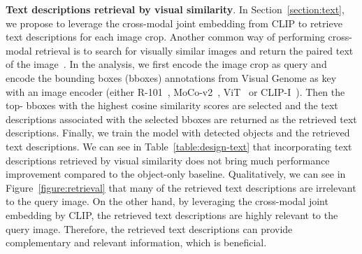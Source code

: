 \documentclass[10pt,twocolumn,letterpaper]{article}
\begin{document}
\begin{table}
\centering
\renewcommand{\arraystretch}{1.2}
\caption{
Retrieving text descriptions by visual similarity with different image encoders.
}
\label{table:design-text}
\end{table} \textbf{Text descriptions retrieval by visual similarity}.
In Section~\ref{section:text}, we propose to leverage the cross-modal joint embedding from CLIP to retrieve text descriptions for each image crop.
Another common way of performing cross-modal retrieval is to search for visually similar images and return the paired text of the image~\cite{gong2014improving,hodosh2013framing,ordonez2011im2text,sun2015automatic}.
In the analysis, we first encode the image crop as query and encode the bounding boxes (bboxes) annotations from Visual Genome as key with an image encoder (either R-101~\cite{he2016deep}, MoCo-v2~\cite{chen2020mocov2}, ViT~\cite{dosovitskiy2020vit} or CLIP-I~\cite{Radford2021LearningTV}).
Then the top- bboxes with the highest cosine similarity scores are selected and the text descriptions associated with the selected bboxes are returned as the retrieved text descriptions.
Finally, we train the  model with detected objects and the retrieved text descriptions.
We can see in Table~\ref{table:design-text} that incorporating text descriptions retrieved by visual similarity does not bring much performance improvement compared to the object-only baseline.
Qualitatively, we can see in Figure~\ref{figure:retrieval} that many of the retrieved text descriptions are irrelevant to the query image.
On the other hand, by leveraging the cross-modal joint embedding by CLIP, the retrieved text descriptions are highly relevant to the query image.
Therefore, the retrieved text descriptions can provide complementary and relevant information, which is beneficial. 
\end{document}
